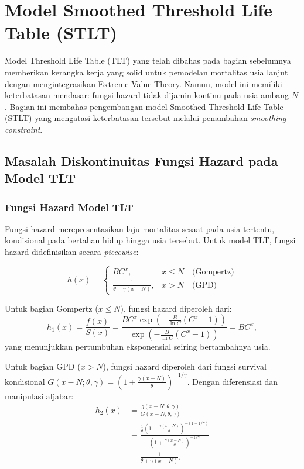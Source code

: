 \section{Model Smoothed Threshold Life Table (STLT)}

Model Threshold Life Table (TLT) yang telah dibahas pada bagian sebelumnya memberikan kerangka kerja yang solid untuk pemodelan mortalitas usia lanjut dengan mengintegrasikan Extreme Value Theory. Namun, model ini memiliki keterbatasan mendasar: fungsi hazard tidak dijamin kontinu pada usia ambang $N$. Bagian ini membahas pengembangan model Smoothed Threshold Life Table (STLT) yang mengatasi keterbatasan tersebut melalui penambahan \textit{smoothing constraint}.

\subsection{Masalah Diskontinuitas Fungsi Hazard pada Model TLT}

\subsubsection{Fungsi Hazard Model TLT}

Fungsi hazard merepresentasikan laju mortalitas sesaat pada usia tertentu, kondisional pada bertahan hidup hingga usia tersebut. Untuk model TLT, fungsi hazard didefinisikan secara \textit{piecewise}:

\begin{equation}
h(x) = 
\begin{cases}
BC^x, & x \leq N \quad \text{(Gompertz)} \\[8pt]
\displaystyle\frac{1}{\theta + \gamma(x-N)}, & x > N \quad \text{(GPD)}
\end{cases}
\label{eq:tlt_hazard_piecewise}
\end{equation}

Untuk bagian Gompertz ($x \leq N$), fungsi hazard diperoleh dari:
\begin{equation}
h_1(x) = \frac{f(x)}{S(x)} = \frac{BC^x \exp\left(-\frac{B}{\ln C}(C^x - 1)\right)}{\exp\left(-\frac{B}{\ln C}(C^x - 1)\right)} = BC^x,
\label{eq:hazard_gompertz_derivation}
\end{equation}
yang menunjukkan pertumbuhan eksponensial seiring bertambahnya usia.

Untuk bagian GPD ($x > N$), fungsi hazard diperoleh dari fungsi survival kondisional $G(x-N; \theta, \gamma) = \left(1 + \frac{\gamma(x-N)}{\theta}\right)^{-1/\gamma}$. Dengan diferensiasi dan manipulasi aljabar:
\begin{align}
h_2(x) &= \frac{g(x-N; \theta, \gamma)}{G(x-N; \theta, \gamma)} \nonumber \\
&= \frac{\frac{1}{\theta}\left(1 + \frac{\gamma(x-N)}{\theta}\right)^{-(1+1/\gamma)}}{\left(1 + \frac{\gamma(x-N)}{\theta}\right)^{-1/\gamma}} \nonumber \\
&= \frac{1}{\theta + \gamma(x-N)}.
\label{eq:hazard_gpd_derivation}
\end{align}

